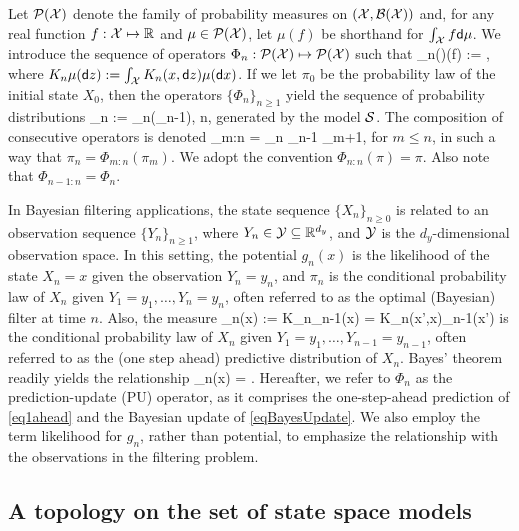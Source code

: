 \documentclass[onefignum,onetabnum]{siamonline250211}%
\begin{document}
Let ${\mathcal P}({\mathcal X})$ denote the family of probability measures on $({\mathcal X},{\mathcal B}({\mathcal X}))$ and, for any real function $f : {\mathcal X} \mapsto \mathbb{R}$ and $\mu\in{\mathcal P}({\mathcal X})$, let $\mu(f)$ be shorthand for $\int_{\mathcal X} f{\sf d}\mu$. We introduce the sequence of operators
$
\Phi_n : {\mathcal P}({\mathcal X}) \mapsto {\mathcal P}({\mathcal X})
$
such that
\beq
\Phi_n(\mu)(f) := ,
\label{eqPUop}
\eeq
where $K_n\mu({\sf d} z) := \int_{{\mathcal X}} K_n(x,{\sf d} z)\mu({\sf d} x)$. 
If we let $\pi_0$ be the probability law of the initial state $X_0$, then the operators $\{\Phi_n\}_{n\ge 1}$ yield the sequence of probability distributions
\beq
\pi_n := \Phi_n(\pi_{n-1}), \quad n,
\eeq
generated by the model ${\mathcal S}$. The composition of consecutive operators is denoted
\beq 
\Phi_{m:n} = \Phi_n \circ \Phi_{n-1} \circ \cdots \circ \Phi_{m+1},
\nn
\eeq
for $m\le n$, in such a way that $\pi_n = \Phi_{m:n}(\pi_m)$. We adopt the convention $\Phi_{n:n}(\pi)=\pi$. Also note that $\Phi_{n-1:n} = \Phi_n$.

In Bayesian filtering applications, the state sequence $\{X_n\}_{n\ge 0}$ is related to an observation sequence $\{Y_n\}_{n\ge 1}$, where $Y_n \in {\mathcal Y} \subseteq \mathbb{R}^{d_y}$, and ${\mathcal Y}$ is the $d_y$-dimensional observation space. In this setting, the potential $g_n(x)$ is the likelihood of the state $X_n=x$ given the observation $Y_n=y_n$, and $\pi_n$ is the conditional probability law of $X_n$ given $Y_1=y_1, \ldots, Y_n=y_n$, often referred to as the optimal (Bayesian) filter at time $n$. Also, the measure
\beq
\xi_n(\sd x) := K_n\pi_{n-1}(\sd x) = \int K_n(x',\sd x)\pi_{n-1}(\sd x')
\label{eq1ahead}
\eeq
is the conditional probability law of $X_n$ given $Y_1=y_1, \ldots, Y_{n-1}=y_{n-1}$, often referred to as the (one step ahead) predictive distribution of $X_n$. Bayes' theorem readily yields the relationship 
\beq
\pi_n(\sd x) = .
\label{eqBayesUpdate}
\eeq
Hereafter, we refer to $\Phi_n$ as the prediction-update (PU) operator, as it comprises the one-step-ahead prediction of \eqref{eq1ahead} and the Bayesian update of \eqref{eqBayesUpdate}. We also employ the term likelihood for $g_n$, rather than potential, to emphasize the relationship with the observations in the filtering problem.
   



% 
\subsection{A topology on the set of state space models}
\end{document}
